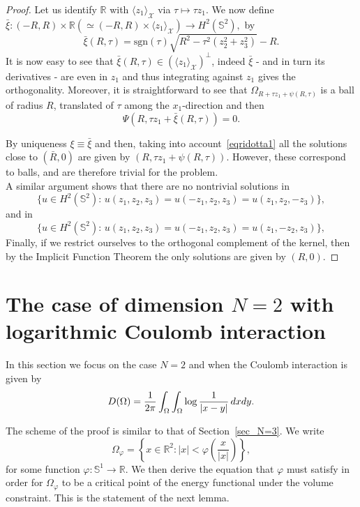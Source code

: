 \documentclass[10pt,reqno,english]{amsart}
\newcommand{\Sd}{\mathbb{S}^2}
\newcommand{\Su}{\mathbb{S}^1}
\newcommand{\R} {\mathbb R}
\theoremstyle{definition}
\numberwithin{equation}{section}
\begin{document}
\begin{proof}
Let us identify $\mathbb{R}$ with $\langle z_1\rangle_{\mathcal X}$ via $\tau\mapsto\tau z_1$.
We now define $\bar\xi:(-R,R)\times\R(\simeq (-R,R)\times \langle z_1 \rangle_{\mathcal X})\to H^2(\Sd),
$ by
\[
\bar\xi(R,\tau)=\text{sgn}(\tau)\sqrt{R^{2}-\tau^{2}(z_2^2+z_3^2)}-R.
\]
It is now easy to see that $\bar\xi(R,\tau)\in(\langle z_1 \rangle_{\mathcal X})^{\perp}$, indeed $\bar\xi$ - and in turn its derivatives - are even in $z_1$ and thus integrating against $z_1$ gives the orthogonality.
Moreover, it is straightforward to see that $\Omega_{R+\tau z_1+\psi(R,\tau)}$ is a ball of radius $R$, translated of $\tau$ among the $x_1$-direction and then
\[
\Psi(R,\tau z_1+\bar\xi(R,\tau))=0.
\]

By uniqueness $\xi\equiv\bar\xi$ and then, taking into account~\eqref{eqridotta1} all the solutions close to $(\bar R,0)$ are given by $(R,\tau z_1+\psi(R,\tau))$. However, these correspond to balls, and are therefore trivial for the problem.\\

A similar argument shows that there are no nontrivial solutions in
\[
\{u\in H^2(\Sd):\,u(z_1,z_2,z_3)=u(-z_1,z_2,z_3)=u(z_1,z_2,-z_3)\},
\]
and in
\[
\{u\in H^2(\Sd):\,u(z_1,z_2,z_3)=u(-z_1,z_2,z_3)=u(z_1,-z_2,z_3)\},
\]
Finally, if we restrict ourselves to the orthogonal complement of the kernel, then by the Implicit Function Theorem the only solutions are given by $(R,0)$.
\end{proof}





\section{The case of dimension \texorpdfstring{$N=2$}{N=2} with logarithmic Coulomb interaction}
\label{sec_N=2}

In this section we focus on the case $N=2$ and when the Coulomb interaction is given by
\[
D (\Omega)={1\over 2\pi} \int_\Omega  \int_\Omega \log {1\over |x-y|} \, dx dy.
\]

The scheme of the proof is similar to that of Section~\ref{sec_N=3}. 
We write
\[
\Omega_\varphi = \left\{ x \in \R^2 : |x| < \varphi\!\left(\frac{x}{|x|}\right) \right\},
\]
for some function $\varphi : \Su \to \R$. We then derive the equation that $\varphi$ must satisfy in order for $\Omega_\varphi$ to be a critical point of the energy functional under the volume constraint. 
This is the statement of the next lemma.
\end{document}
